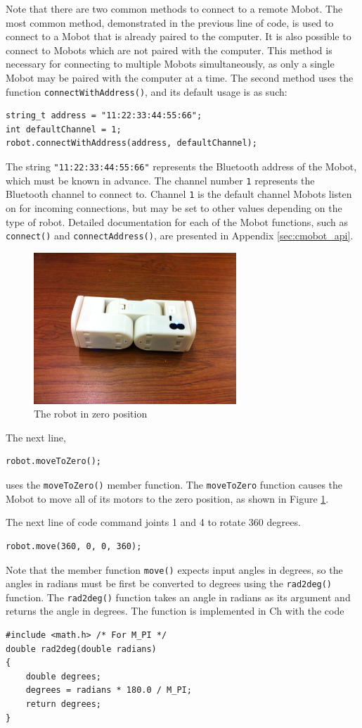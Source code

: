 \documentclass{article}
\begin{document}
Note that there are two common methods to connect to a remote Mobot. 
The most common method, demonstrated in the previous line of code, is
used to connect to a Mobot that is already paired to the computer. It
is also possible to connect to Mobots which are not paired with the 
computer. This method is necessary for connecting to multiple
Mobots simultaneously, as only a single Mobot may be paired with the
computer at a time. The second method uses the function
\texttt{connectWithAddress()}, and its default usage is as such:
\begin{verbatim}
string_t address = "11:22:33:44:55:66";
int defaultChannel = 1;
robot.connectWithAddress(address, defaultChannel);
\end{verbatim}
The string \texttt{"11:22:33:44:55:66"} represents the Bluetooth address
of the Mobot, which must be known in advance. The channel number \texttt{1} 
represents the Bluetooth channel to connect to. Channel \texttt{1}
is the default channel Mobots listen on for incoming connections, but
may be set to other values depending on the type of robot. Detailed
documentation for each of the Mobot functions, such as 
\texttt{connect()} and \texttt{connectAddress()}, are presented in
Appendix \ref{sec:cmobot_api}.

\begin{figure}
  \centering
  \includegraphics[width=3in]{images/inchworm1.jpg}
  \caption{The robot in zero position}
  \label{fig:zeroposition}
\end{figure}

The next line,
\begin{verbatim}
robot.moveToZero();
\end{verbatim}
uses the \texttt{moveToZero()} member function. The
\texttt{moveToZero} function causes the Mobot to move all of its motors to the
zero position, as shown in Figure \ref{fig:zeroposition}.

The next line of code command joints 1 and 4 to rotate 360 degrees.
\begin{verbatim}
robot.move(360, 0, 0, 360);
\end{verbatim}
Note that the member function \texttt{move()} expects input angles
in degrees, so the angles in radians must be first be converted to degrees 
using the \texttt{rad2deg()} function. The \texttt{rad2deg()} function
takes an angle in radians as its argument and returns the angle in
degrees. The function is implemented in Ch with the code
\begin{verbatim}
#include <math.h> /* For M_PI */
double rad2deg(double radians)
{
    double degrees;
    degrees = radians * 180.0 / M_PI;
    return degrees;
}
\end{verbatim}
\end{document}
